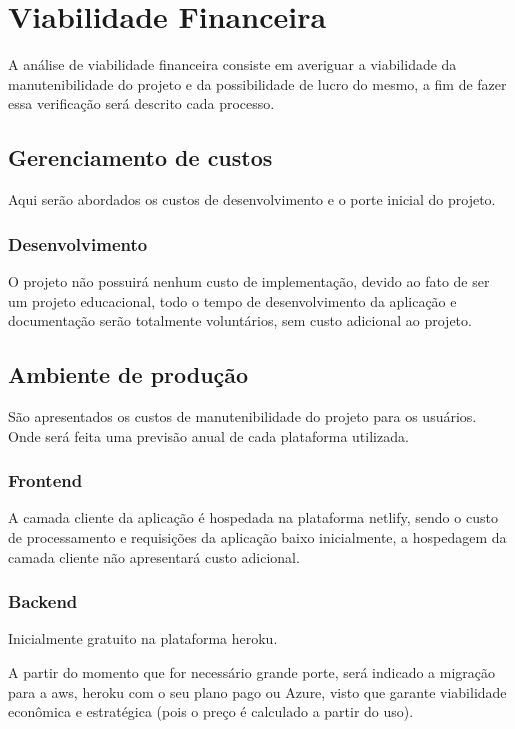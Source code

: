 \section{Viabilidade Financeira}
A análise de viabilidade financeira consiste em averiguar a viabilidade da manutenibilidade do projeto
e da possibilidade de lucro do mesmo, a fim de fazer essa verificação será descrito cada processo.

\subsection{Gerenciamento de custos}
Aqui serão abordados os custos de desenvolvimento e o porte inicial do projeto.

\subsubsection{Desenvolvimento}
O projeto não possuirá nenhum custo de implementação, devido ao fato de ser um projeto educacional,
todo o tempo de desenvolvimento da aplicação e documentação serão totalmente voluntários, sem custo adicional ao projeto.

\subsection{Ambiente de produção}
São apresentados os custos de manutenibilidade do projeto para os usuários. 
Onde será feita uma previsão anual de cada plataforma utilizada.

\subsubsection{Frontend}
A camada cliente da aplicação é hospedada na plataforma \gls{netlify}, sendo o custo de processamento e requisições da aplicação
baixo inicialmente, a hospedagem da camada cliente não apresentará custo adicional.

\subsubsection{Backend}
Inicialmente gratuito na plataforma \gls{heroku}.

A partir do momento que for necessário grande porte, será indicado a migração para a \gls{aws}, \gls{heroku} com o seu plano pago ou Azure,
visto que garante viabilidade econômica e estratégica (pois o
preço é calculado a partir do uso).

